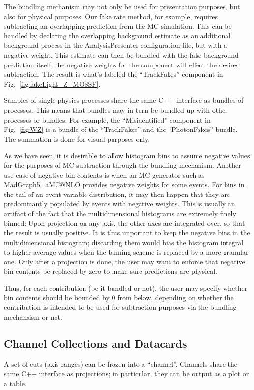 The bundling mechanism may not only be used for presentation purposes, but also for physical purposes. Our fake rate method, for example, requires subtracting an overlapping prediction from the \ttbar MC simulation. This can be handled by declaring the overlapping \ttbar background estimate as an additional background process in the AnalysisPresenter configuration file, but with a negative weight. This estimate can then be bundled with the fake background prediction itself; the negative weights for the \ttbar component will effect the desired subtraction. The result is what's labeled the ``TrackFakes'' component in Fig.~\ref{fig:fakeLight_Z_MOSSF}.

Samples of single physics processes share the same C++ interface as bundles of processes. This means that bundles may in turn be bundled up with other processes or bundles. For example, the ``Misidentified'' component in Fig.~\ref{fig:WZ} is a bundle of the ``TrackFakes'' and the ``PhotonFakes'' bundle. The summation is done for visual purposes only.

As we have seen, it is desirable to allow histogram bins to assume negative values for the purposes of MC subtraction through the bundling mechanism. Another use case of negative bin contents is when an MC generator such as MadGraph5\_aMC@NLO \cite{Alwall:2011uj} provides negative weights for some events. For bins in the tail of an event variable distribution, it may then happen that they are predominantly populated by events with negative weights. This is usually an artifact of the fact that the multidimensional histograms are extremely finely binned: Upon projection on any axis, the other axes are integrated over, so that the result is usually positive. It is thus important to keep the negative bins in the multidimensional histogram; discarding them would bias the histogram integral to higher average values when the binning scheme is replaced by a more granular one. Only after a projection is done, the user may want to enforce that negative bin contents be replaced by zero to make sure predictions are physical.

Thus, for each contribution (be it bundled or not), the user may specify whether bin contents should be bounded by 0 from below, depending on whether the contribution is intended to be used for subtraction purposes via the bundling mechansism or not.

\subsection{Channel Collections and Datacards}
A set of cuts (axis ranges) can be frozen into a ``channel''. Channels share the same C++ interface as projections; in particular, they can be output as a plot or a table.

